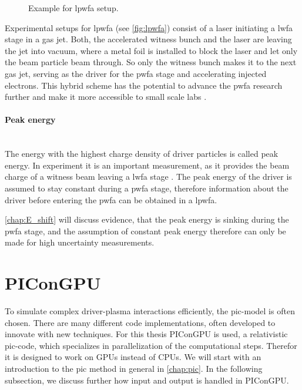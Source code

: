 \documentclass[bachelor_thesis]{subfiles}
\begin{document}
\begin{figure}
	\centering
	\caption{Example for \gls{lpwfa} setup.}
	\label{fig:lpwfa}
\end{figure}
Experimental setups for \gls{lpwfa} (see \autoref{fig:lpwfa}) consist of a laser initiating a \gls{lwfa} stage in a gas jet. 
Both, the accelerated witness bunch and the laser are leaving the jet into vacuum, where a metal foil is installed to block the laser and let only the beam particle beam through. 
So only the witness bunch makes it to the next gas jet, serving as the driver for the \gls{pwfa} stage and accelerating injected electrons.
This hybrid scheme has the potential to advance the \gls{pwfa} research further and make it more accessible to small scale labs \cite{Kurz2021}.

\paragraph*{Peak energy}\hspace{0pt} \\
The energy with the highest charge density of driver particles is called peak energy. In experiment it is an important measurement, as it provides the beam charge of a witness beam leaving a \gls{lwfa} stage \cite{Schoebel2021}.
The peak energy of the driver is assumed to stay constant during a \gls{pwfa} stage, therefore information about the driver before entering the \gls{pwfa} can be obtained in a \gls{lpwfa}.

\autoref{chap:E_shift} will discuss evidence, that the peak energy is sinking during the \gls{pwfa} stage, and the assumption of constant peak energy therefore can only be made for high uncertainty measurements.

\section{PIConGPU}
To simulate complex driver-plasma interactions efficiently, the \gls{pic}-model is often chosen. There are many different code implementations, often developed to innovate with new techniques. For this thesis PIConGPU \cite{PIConGPU2013, PICRepo} is used, 
a relativistic \gls{pic}-code, which specializes in parallelization of the computational steps. Therefor it is designed to work on GPUs instead of CPUs. We will start with an introduction to the \gls{pic} method in general in \autoref{chap:pic}.
In the following subsection, we discuss further how input and output is handled in PIConGPU.
\end{document}

